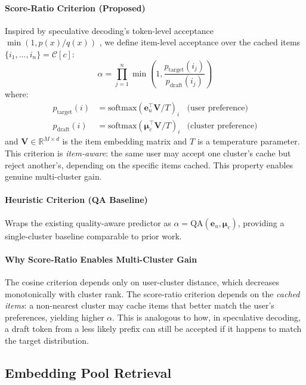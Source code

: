 \documentclass{article}
\begin{document}
\paragraph{Score-Ratio Criterion (Proposed)}
Inspired by speculative decoding's token-level acceptance $\min(1, p(x)/q(x))$ \citep{leviathan2023}, we define item-level acceptance over the cached items $\{i_1, \ldots, i_n\} = \mathcal{C}[c]$:
\begin{equation}
\alpha = \prod_{j=1}^{n} \min\left(1, \frac{p_{\text{target}}(i_j)}{p_{\text{draft}}(i_j)}\right)
\label{eq:score_ratio}
\end{equation}
where:
\begin{align}
p_{\text{target}}(i) &= \text{softmax}\left(\mathbf{e}_u^\top \mathbf{V} / T\right)_i & \text{(user preference)} \\
p_{\text{draft}}(i) &= \text{softmax}\left(\boldsymbol{\mu}_c^\top \mathbf{V} / T\right)_i & \text{(cluster preference)}
\end{align}
and $\mathbf{V} \in \mathbb{R}^{M \times d}$ is the item embedding matrix and $T$ is a temperature parameter. This criterion is \emph{item-aware}: the same user may accept one cluster's cache but reject another's, depending on the specific items cached. This property enables genuine multi-cluster gain.

\paragraph{Heuristic Criterion (QA Baseline)}
Wraps the existing quality-aware predictor as $\alpha = \text{QA}(\mathbf{e}_u, \boldsymbol{\mu}_c)$, providing a single-cluster baseline comparable to prior work.

\paragraph{Why Score-Ratio Enables Multi-Cluster Gain}
The cosine criterion depends only on user-cluster distance, which decreases monotonically with cluster rank. The score-ratio criterion depends on the \emph{cached items}: a non-nearest cluster may cache items that better match the user's preferences, yielding higher $\alpha$. This is analogous to how, in speculative decoding, a draft token from a less likely prefix can still be accepted if it happens to match the target distribution.

\subsection{Embedding Pool Retrieval}
\label{sec:pool_retrieval}
\end{document}
